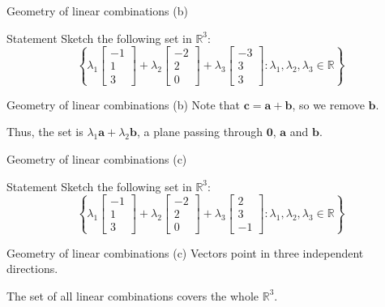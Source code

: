 \documentclass[10pt]{beamer}
\begin{document}
\begin{frame}{Geometry of linear combinations (b)}
    \begin{block}{Statement}
        Sketch the following set in $\mathbb R^3$:
        $$\left\{\lambda_1 \begin{bmatrix}-1 \\ 1 \\ 3\end{bmatrix} + \lambda_2 \begin{bmatrix}-2 \\ 2 \\ 0\end{bmatrix} + \lambda_3 \begin{bmatrix}-3 \\ 3 \\ 3\end{bmatrix} : \lambda_1, \lambda_2, \lambda_3 \in \mathbb R\right\}$$
    \end{block}
\end{frame}

\begin{frame}{Geometry of linear combinations (b)}
    Note that $\mathbf c = \mathbf a + \mathbf b$, so we remove $\mathbf b$.

    Thus, the set is $\lambda_1 \mathbf a + \lambda_2 \mathbf b$, a plane passing through $\mathbf 0$, $\mathbf a$ and $\mathbf b$.
\end{frame}

\begin{frame}{Geometry of linear combinations (c)}
    \begin{block}{Statement}
    Sketch the following set in $\mathbb R^3$:
    $$\left\{\lambda_1 \begin{bmatrix}-1 \\ 1 \\ 3\end{bmatrix} + \lambda_2 \begin{bmatrix}-2 \\ 2 \\ 0\end{bmatrix} + \lambda_3 \begin{bmatrix}2 \\ 3 \\ -1\end{bmatrix} : \lambda_1, \lambda_2, \lambda_3 \in \mathbb R\right\}$$
    \end{block}
\end{frame}

\begin{frame}{Geometry of linear combinations (c)}
    Vectors point in three independent directions.

    The set of all linear combinations covers the whole $\mathbb R^3$.
\end{frame}
\end{document}
